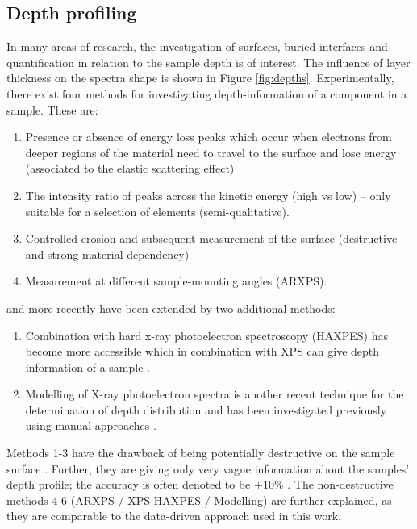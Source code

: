 \subsection{Depth profiling}
In many areas of research, the investigation of surfaces, buried interfaces and quantification in relation to the sample depth is of interest. The influence of layer thickness on the spectra shape is shown in Figure \ref{fig:depths}. Experimentally, there exist four methods for investigating depth-information of a component in a sample. These are:
\begin{enumerate}
    \item Presence or absence of energy loss peaks which occur when electrons from deeper regions of the material need to travel to the surface and lose energy (associated to the elastic scattering effect)
    \item The intensity ratio of peaks across the kinetic energy (high vs low) – only suitable for a selection of elements (semi-qualitative).
    \item Controlled erosion and subsequent measurement of the surface (destructive and strong material dependency)
    \item Measurement at different sample-mounting angles (ARXPS). \cite{moulder_handbook_1992} 
    \end{enumerate}
and more recently have been extended by two additional methods:
\begin{enumerate}[resume]
    \item Combination with hard x-ray photoelectron spectroscopy (HAXPES) has become more accessible which in combination with XPS can give depth information of a sample \cite{zborowski_improved_2022}.
    \item Modelling of X-ray photoelectron spectra is another recent technique for the determination of depth distribution and has been investigated previously using manual approaches \cite{zborowski_comparison_2022}.

\end{enumerate}


Methods 1-3 have the drawback of being potentially destructive on the sample surface \cite{greczynski_towards_2021}. Further, they are giving only very vague information about the samples’ depth profile; the accuracy is often denoted to be $\pm$10\% \cite{}.
The non-destructive methods 4-6 (ARXPS / XPS-HAXPES / Modelling) are further explained, as they are comparable to the data-driven approach used in this work.

